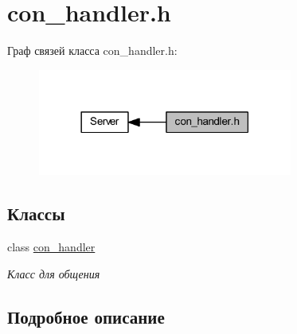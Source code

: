 \hypertarget{group__con__handler__h}{}\section{con\+\_\+handler.\+h}
\label{group__con__handler__h}
Граф связей класса con\+\_\+handler.\+h\+:
\nopagebreak
\begin{figure}[H]
\begin{center}
\leavevmode
\includegraphics[width=237pt]{group__con__handler__h}
\end{center}
\end{figure}
\subsection*{Классы}
\begin{DoxyCompactItemize}
\item 
class \mbox{\hyperlink{classcon__handler}{con\+\_\+handler}}
\begin{DoxyCompactList}\small\item\em Класс для общения \end{DoxyCompactList}\end{DoxyCompactItemize}


\subsection{Подробное описание}
